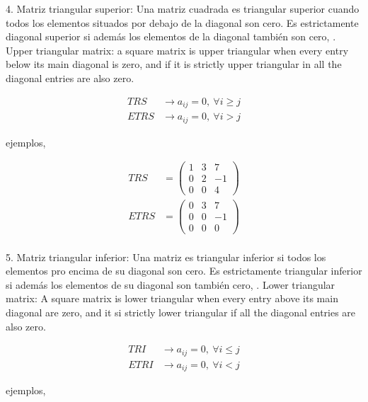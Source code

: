 \begin{paracol}{2}
4. Matriz triangular superior: Una matriz cuadrada es triangular superior cuando todos los elementos situados por debajo de la diagonal son cero. Es estrictamente diagonal superior si además los elementos de la diagonal también son cero,
. Upper triangular matrix: a square matrix is upper triangular when every entry below its main diagonal is zero, and if it is strictly upper triangular in all the diagonal entries are also zero.   
\end{paracol}
\begin{align*}
TRS& \rightarrow a_{ij} = 0, \ \forall i\geq j \\
ETRS& \rightarrow a_{ij} = 0, \ \forall i > j 
\end{align*}
\begin{paracol}{2}
ejemplos,
\end{paracol}

\begin{align*}
TRS&=\begin{pmatrix}
1 & 3 & 7\\
0 & 2 & -1\\
0 & 0 & 4
\end{pmatrix}\\
ETRS&=\begin{pmatrix}
0 & 3 & 7\\
0 & 0 & -1\\
0 & 0 & 0
\end{pmatrix}\\
\end{align*}
\begin{paracol}{2}
5. Matriz triangular inferior: Una matriz es triangular inferior si todos los elementos pro encima de su diagonal son cero. Es estrictamente triangular inferior si además los elementos de su diagonal son también cero,
. Lower triangular matrix: A square matrix is lower triangular when every entry above its main diagonal are zero, and it si strictly lower triangular if all the diagonal entries are also zero. 
\end{paracol}
\begin{align*}
TRI& \rightarrow a_{ij} = 0, \ \forall i\leq j \\
ETRI& \rightarrow a_{ij} = 0, \ \forall i < j 
\end{align*}
\begin{paracol}{2}
ejemplos,
\end{paracol}

